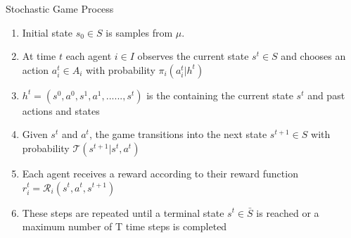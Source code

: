 \begin{frame}{Stochastic Game Process}

\begin{enumerate}
    \item<1-> Initial state $s_0 \in S$ is samples from $\mu$.
    \item<2-> At time $t$ each agent $i \in I$ observes the current state $s^{t} \in S$ and chooses an action $a^{t}_i \in A_i$ with probability $\pi_i(a^{t}_i|h^{t})$ 
    \vspace{2pt}
    \blist
        \item<3-> $h^t = (s^0, a^0, s^1, a^1, ......, s^t)$ is the  containing the current state $s^t$ and past  actions and states
    \elist
    \vspace{2pt}
    \item<4-> Given $s^t$ and $a^t$, the game transitions into the next state $s^{t+1} \in S$ with probability $\mathcal{T}(s^{t+1}|s^t, a^t)$
    \item<5->  Each agent receives a reward according to their reward function $r^{t}_{i} = \mathcal{R}_{i} (s^t, a^t, s^{t+1})$ 
    \item<6-> These steps are repeated until a terminal state $s^t \in \bar{S}$ is reached or a maximum number of T time steps is completed
\end{enumerate}
\end{frame}



